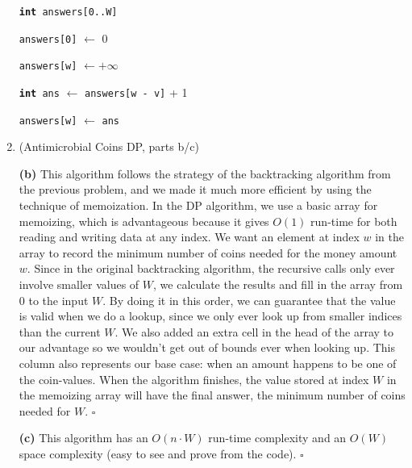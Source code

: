 \documentclass{article}
\begin{document}
\begin{enumerate}
\begin{center}
\begin{minipage}{0.625\linewidth}
\begin{algorithm}[H]
          \texttt{\textbf{int} answers[0..W]}

          \texttt{answers[0]} $\gets$ 0

          {
            \texttt{answers[w]} $\gets +\infty$

            {
              {
                \texttt{\textbf{int} ans} $\gets$ \texttt{answers[w - v]} + 1

                {
                  \texttt{answers[w]} $\gets$ \texttt{ans}
                }
              }
            }
          }

        \end{algorithm}
      \end{minipage}
    \end{center}

    \pagebreak

    \setcounter{enumi}{1} %
  \item (Antimicrobial Coins DP, parts b/c)

    \textbf{(b)} This algorithm follows the strategy of the backtracking algorithm from the previous problem, and we made it much more efficient by using the technique of memoization. In the DP algorithm, we use a basic array for memoizing, which is advantageous because it gives $O(1)$ run-time for both reading and writing data at any index. We want an element at index $w$ in the array to record the minimum number of coins needed for the money amount $w$. Since in the original backtracking algorithm, the recursive calls only ever involve smaller values of $W$, we calculate the results and fill in the array from 0 to the input $W$. By doing it in this order, we can guarantee that the value is valid when we do a lookup, since we only ever look up from smaller indices than the current $W$. We also added an extra cell in the head of the array to our advantage so we wouldn't get out of bounds ever when looking up. This column also represents our base case: when an amount happens to be one of the coin-values. When the algorithm finishes, the value stored at index $W$ in the memoizing array will have the final answer, the minimum number of coins needed for $W$. $\square$

    \textbf{(c)} This algorithm has an $O(n \cdot W)$ run-time complexity and an $O(W)$ space complexity (easy to see and prove from the code). $\square$


\end{enumerate}
\end{document}
